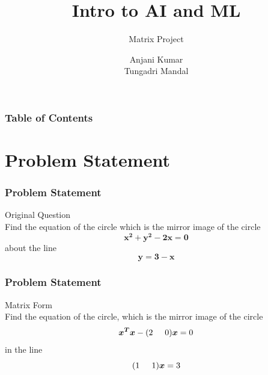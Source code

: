 \documentclass{beamer}
\title{Intro to AI and ML}
\subtitle{Matrix Project}
\author{Anjani Kumar\texorpdfstring{\\ Tungadri Mandal}{}}
\begin{document}
 

\frame{\titlepage}

\begin{frame}
\frametitle{Table of Contents}
\tableofcontents
\end{frame}

\section{Problem Statement}
\begin{frame}
\frametitle{Problem Statement }
Original Question\\
Find the equation of the circle which is the mirror image of the circle\\
\begin{equation}
    \boldsymbol{{x^2}+{y^2}-2x=0}
\end{equation}
about the line\\
\begin{equation}
    \boldsymbol{y=3-x}
\end{equation}
\end{frame}

\begin{frame}
\frametitle{Problem Statement }
Matrix Form\\
Find the equation of the circle, which is the
mirror image of the circle
\begin{equation}
    \boldsymbol{x^Tx} - (2\hspace{5mm} 0)\boldsymbol{x} = 0
\end{equation}
in the line 
\begin{equation}
    (1\hspace{5mm} 1)\boldsymbol{x} = 3
\end{equation}
\end{frame}
\end{document}
